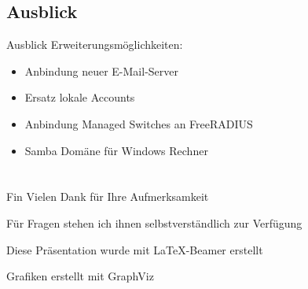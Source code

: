 \documentclass[presentation,svgnames,12pt]{beamer}
\begin{document}
\subsection{Ausblick}
\begin{frame}{Ausblick}
Erweiterungsmöglichkeiten:
\vspace{6pt}
	\begin{itemize}
		\item Anbindung neuer E-Mail-Server%
		\item Ersatz lokale Accounts
		\item Anbindung Managed Switches an FreeRADIUS
		\item Samba Domäne für Windows Rechner
	\end{itemize}
\end{frame}


\section{} %
\begin{frame}{Fin}
	\bigskip\bigskip\bigskip\bigskip\bigskip\bigskip
	Vielen Dank für Ihre Aufmerksamkeit
	
	Für Fragen stehen ich ihnen selbstverständlich zur Verfügung
	
	\bigskip\bigskip\bigskip
	\bigskip
	\bigskip
	\bigskip Diese Präsentation wurde mit \LaTeX{}-Beamer erstellt
	
	Grafiken erstellt mit GraphViz
\end{frame}


%
%
\end{document}
